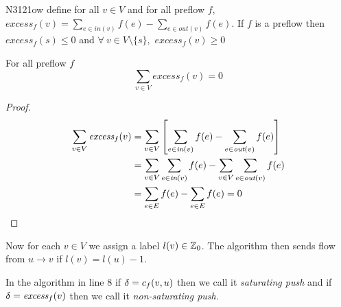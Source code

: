 N3121ow define for all $v\in V$ and for all preflow $f$, $\textit{excess}_f(v)=\sum\limits_{e\in\textit{in}(v)}f(e)-\sum\limits_{e\in\textit{out}(v)}f(e)$. If $f$ is a preflow then $\textit{excess}_f(s)\leq 0$ and $\forall\ v\in V\setminus\{s\},$ $\textit{excess}_f(v)\geq 0$
\begin{lemma}{}{}
	For all preflow $f$ $$\sum\limits_{v\in V}\textit{excess}_f(v)=0$$
\end{lemma}
\begin{proof}
	\begin{align*}
		\sum\limits_{v\in V}\textit{excess}_f(v) & = \sum\limits_{v\in V}\left[ \sum\limits_{e\in\textit{in}(v)}f(e)-\sum\limits_{e\in\textit{out}(v)}f(e)\right]\\
		& = \sum\limits_{v\in V}\sum\limits_{e\in\textit{in}(v)}f(e)-\sum\limits_{v\in V}\sum\limits_{e\in\textit{out}(v)}f(e)\\
		& = \sum_{e\in E}f(e)-\sum_{e\in E}f(e)=0
	\end{align*}
\end{proof}
Now for each $v\in V$ we assign a label $l(v)\in\mathbb{Z}_0$. The algorithm then sends flow from $u\to v$ if $l(v)=l(u)-1$.
\begin{center}
\end{center}
 \begin{algorithm}
 \DontPrintSemicolon
\caption{}
 \end{algorithm}
In the algorithm in line 8 if $\delta=c_f(v,u)$ then we call it \textit{saturating push} and if $\delta=\textit{excess}_f(v)$ then we call it \textit{non-saturating push}.

